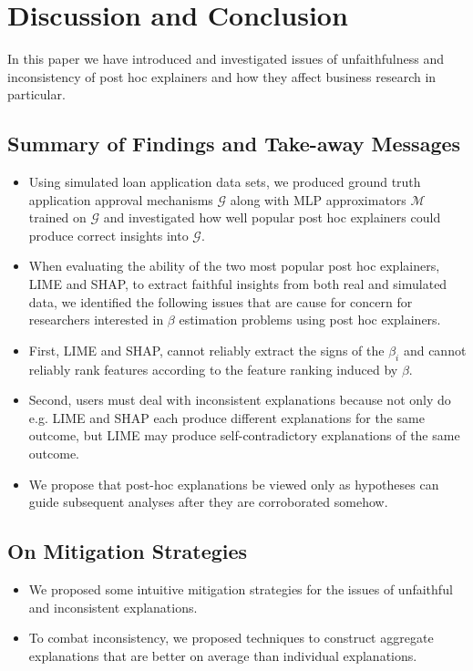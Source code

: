 \documentclass[mnsc,blindrev]{informs3}
\begin{document}
\section{Discussion and Conclusion}
    \label{sec:discussion}
    In this paper we have introduced and investigated issues of unfaithfulness and inconsistency of post hoc explainers and how they affect business research in particular. 

    \subsection{Summary of Findings and Take-away Messages}
        \begin{itemize}
        \item Using simulated loan application data sets, we produced ground truth application approval mechanisms $\mathcal{G}$ along with MLP approximators $\mathcal{M}$ trained on $\mathcal{G}$ and investigated how well popular post hoc explainers could produce correct insights into $\mathcal{G}$. 

        \item When evaluating the ability of the two most popular post hoc explainers, LIME and SHAP, to extract faithful insights from both real and simulated data, we identified the following issues that are cause for concern for researchers interested in $\beta$ estimation problems using post hoc explainers. 
        
        \item First, LIME and SHAP, cannot reliably extract the signs of the $\beta_i$ and cannot reliably rank features according to the feature ranking induced by $\beta$. 
        
        \item Second, users must deal with inconsistent explanations because not only do e.g. LIME and SHAP each produce different explanations for the same outcome, but LIME may produce self-contradictory explanations of the same outcome. 

        \item We propose that post-hoc explanations be viewed only as hypotheses can guide subsequent analyses after they are corroborated somehow. 

        \end{itemize}
    \subsection{On Mitigation Strategies}
        \begin{itemize}
        \item We proposed some intuitive mitigation strategies for the issues of unfaithful and inconsistent explanations. 
    
        \item To combat inconsistency, we proposed techniques to construct aggregate explanations that are better on average than individual explanations. 
        \end{itemize}
\end{document}
